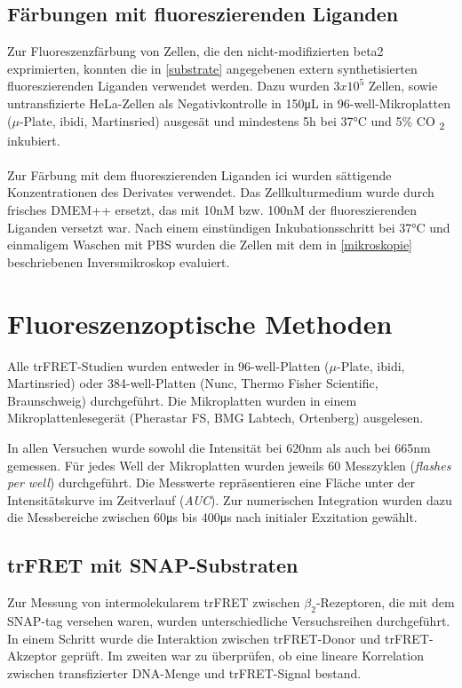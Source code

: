 \subsection{Färbungen mit fluoreszierenden Liganden}
Zur Fluoreszenzfärbung von Zellen, die den nicht-modifizierten \gls{beta2} exprimierten, konnten die in \ref{substrate} angegebenen extern synthetisierten fluoreszierenden Liganden verwendet werden. Dazu wurden $3x10^5$ Zellen, sowie untransfizierte HeLa-Zellen als Negativkontrolle in 150\si{\micro\liter} in 96-well-Mikroplatten ($\mu$-Plate, ibidi, Martinsried) ausgesät und mindestens 5\si{\hour} bei 37\si{\celsius} und 5\% CO \textsubscript{2} inkubiert.
\\ \\
Zur Färbung mit dem fluoreszierenden Liganden \gls{ici} wurden sättigende Konzentrationen des Derivates verwendet. Das Zellkulturmedium wurde durch frisches DMEM++ ersetzt, das mit 10\si{\nano M} bzw. 100\si{\nano M} der fluoreszierenden Liganden versetzt war. Nach einem einstündigen Inkubationsschritt bei 37\si{\celsius} und einmaligem Waschen mit PBS wurden die Zellen mit dem in \ref{mikroskopie} beschriebenen Inversmikroskop evaluiert.

\section{Fluoreszenzoptische Methoden}

Alle trFRET-Studien wurden entweder in 96-well-Platten ($\mu$-Plate, ibidi, Martinsried) oder 384-well-Platten (Nunc, Thermo Fisher Scientific, Braunschweig) durchgeführt. Die Mikroplatten wurden in einem Mikroplattenlesegerät (Pherastar FS, BMG Labtech, Ortenberg) ausgelesen. 

In allen Versuchen wurde sowohl die Intensität bei 620\si{\nano\meter} als auch bei 665\si{\nano\meter} gemessen. Für jedes Well der Mikroplatten wurden jeweils 60 Messzyklen (\textit{flashes per well}) durchgeführt. Die Messwerte repräsentieren eine Fläche unter der Intensitätskurve im Zeitverlauf (\textit{AUC}). Zur numerischen Integration wurden dazu die Messbereiche zwischen 60\si{\micro\second} bis 400\si{\micro\second} nach initialer Exzitation gewählt. 

\subsection{trFRET mit SNAP-Substraten}
Zur Messung von intermolekularem trFRET zwischen $\beta_2$-Rezeptoren, die mit dem SNAP-tag versehen waren, wurden unterschiedliche Versuchsreihen durchgeführt. In einem Schritt wurde die Interaktion zwischen trFRET-Donor und trFRET-Akzeptor geprüft. Im zweiten war zu überprüfen, ob eine lineare Korrelation zwischen transfizierter DNA-Menge und trFRET-Signal bestand.

